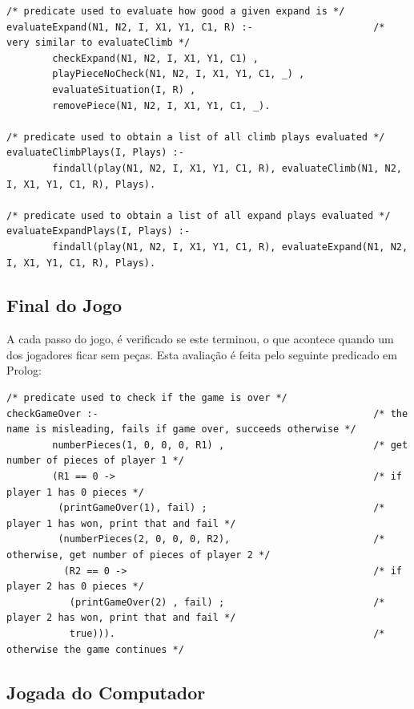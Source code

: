 \documentclass[a4paper]{article}
\begin{document}
\begin{lstlisting}
/* predicate used to evaluate how good a given expand is */
evaluateExpand(N1, N2, I, X1, Y1, C1, R) :-                     /* very similar to evaluateClimb */
        checkExpand(N1, N2, I, X1, Y1, C1) , 
        playPieceNoCheck(N1, N2, I, X1, Y1, C1, _) , 
        evaluateSituation(I, R) , 
        removePiece(N1, N2, I, X1, Y1, C1, _).

/* predicate used to obtain a list of all climb plays evaluated */
evaluateClimbPlays(I, Plays) :- 
        findall(play(N1, N2, I, X1, Y1, C1, R), evaluateClimb(N1, N2, I, X1, Y1, C1, R), Plays).

/* predicate used to obtain a list of all expand plays evaluated */
evaluateExpandPlays(I, Plays) :- 
        findall(play(N1, N2, I, X1, Y1, C1, R), evaluateExpand(N1, N2, I, X1, Y1, C1, R), Plays).
\end{lstlisting}

\subsection{Final do Jogo}

A cada passo do jogo, é verificado se este terminou, o que acontece quando um dos jogadores ficar sem peças. Esta avaliação é feita pelo seguinte predicado em Prolog:

\begin{lstlisting}
/* predicate used to check if the game is over */
checkGameOver :-                                                /* the name is misleading, fails if game over, succeeds otherwise */
        numberPieces(1, 0, 0, 0, R1) ,                          /* get number of pieces of player 1 */
        (R1 == 0 ->                                             /* if player 1 has 0 pieces */
         (printGameOver(1), fail) ;                             /* player 1 has won, print that and fail */
         (numberPieces(2, 0, 0, 0, R2),                         /* otherwise, get number of pieces of player 2 */      
          (R2 == 0 ->                                           /* if player 2 has 0 pieces */   
           (printGameOver(2) , fail) ;                          /* player 2 has won, print that and fail */ 
           true))).                                             /* otherwise the game continues */
\end{lstlisting}

\subsection{Jogada do Computador} 
\end{document}
